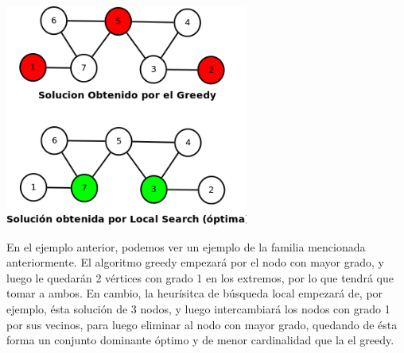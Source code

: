 \begin{center}
\includegraphics[width=8cm]{./graficos/familiaLocal.png}
\end{center}

En el ejemplo anterior, podemos ver un ejemplo de la familia mencionada anteriormente. El algoritmo greedy empezará por el nodo con mayor grado, y luego le quedarán 2 vértices con grado 1 en los extremos, por lo que tendrá que tomar a ambos. En cambio, la heurísitca de búsqueda local empezará de, por ejemplo, ésta solución de 3 nodos, y luego intercambiará los nodos con grado 1 por sus vecinos, para luego eliminar al nodo con mayor grado, quedando de ésta forma un conjunto dominante óptimo y de menor cardinalidad que la el greedy.

